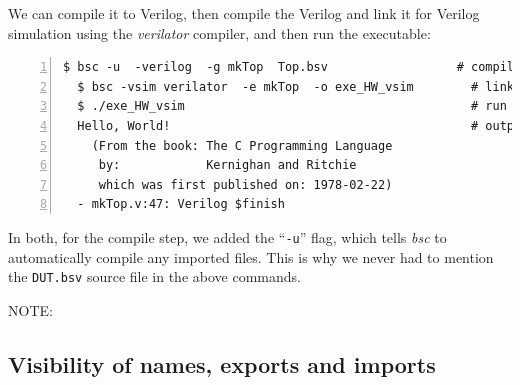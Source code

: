 We can compile it to Verilog, then compile the Verilog and link it for
Verilog simulation using the \emph{verilator} compiler, and then run
the executable:

{\footnotesize
\begin{Verbatim}[frame=single, numbers=left]
  $ bsc -u  -verilog  -g mkTop  Top.bsv                  # compile -> mkTop.v
  $ bsc -vsim verilator  -e mkTop  -o exe_HW_vsim        # link
  $ ./exe_HW_vsim                                        # run
  Hello, World!                                          # output
    (From the book: The C Programming Language
     by:            Kernighan and Ritchie
     which was first published on: 1978-02-22)
  - mkTop.v:47: Verilog $finish
\end{Verbatim}
}

In both, for the compile step, we added the ``\verb|-u|'' flag, which
tells \emph{bsc} to automatically compile any imported files.  This is
why we never had to mention the \verb|DUT.bsv| source file in the
above commands.




\vspace{2ex}

NOTE: 


\subsection{Visibility of names, exports and imports}

